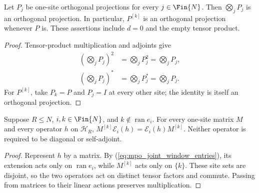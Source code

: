 \begin{theorem}
    \label{thm:mpo_joint_tensor_site_projections}
    Let $P_j$ be one-site orthogonal projections for every
    $j\in\Fin{N}$. Then $\bigotimes_jP_j$ is an orthogonal projection.
    In particular, $P^{[k]}$ is an orthogonal projection whenever $P$ is.
    These assertions include $d=0$ and the empty tensor product.
\end{theorem}
\begin{proof}
    Tensor-product multiplication and adjoints give
    \begin{align}
        \left(\bigotimes_jP_j\right)^2
         & =\bigotimes_jP_j^2=\bigotimes_jP_j, \\
        \left(\bigotimes_jP_j\right)^*
         & =\bigotimes_jP_j^*=\bigotimes_jP_j.
    \end{align}
    For $P^{[k]}$, take $P_k=P$ and $P_j=I$ at every other site;
    the identity is itself an orthogonal projection.
\end{proof}

\begin{theorem}
    \label{thm:mpo_joint_site_window_commutation}
    Suppose $R\leq N$, $i,k\in\Fin{N}$, and $k\notin\operatorname{ran}e_i$.
    For every one-site matrix $M$ and every operator $h$ on $\mathcal H_R$,
    $M^{[k]}\mathcal E_i(h)=\mathcal E_i(h)M^{[k]}$.
    Neither operator is required to be diagonal or self-adjoint.
\end{theorem}
\begin{proof}
    Represent $h$ by a matrix. By
    (\ref{eq:mpo_joint_window_entries}), its extension acts only on
    $\operatorname{ran}e_i$, while $M^{[k]}$ acts only on $\{k\}$.
    These site sets are disjoint, so the two operators act on distinct
    tensor factors and commute. Passing from matrices to their linear
    actions preserves multiplication.
\end{proof}

